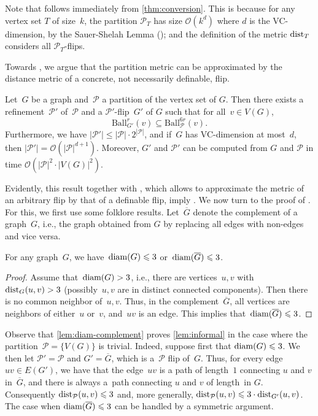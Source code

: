 \documentclass[a4paper,UKenglish,cleveref, autoref, thm-restate]{lipics-v2021}
\newcommand{\Oof}{{\cal O}}
\renewcommand{\cal}{\mathcal}
\newcommand{\dist}{\textnormal{dist}}
\newcommand{\diam}{\textnormal{diam}}
\newcommand{\PP}{\mathcal{P}}
\renewcommand{\le}{\leqslant}
\renewcommand{\leq}{\le}
\newcommand{\Ball}{\mathrm{Ball}}
\newcommand{\Oh}{\mathcal{O}}
\begin{document}
Note that  follows immediately from \cref{thm:conversion}. This is because for any vertex set $T$ of size~$k$, the partition $\PP_T$ has size $\Oh(k^d)$ where $d$ is the VC-dimension, by the Sauer-Shelah Lemma (); and the definition of the metric $\dist_T$ considers all $\PP_T$-flips.










Towards , we argue that the partition metric can be approximated by the distance metric of a concrete, not necessarily definable, flip. 

\begin{lemma}
  Let~$G$ be a graph and~$\PP$ a partition of the vertex set of $G$.
  Then there exists a refinement~$\PP'$ of~$\PP$ and a $\PP'$-flip~$G'$ of $G$ such that for all~$v \in V(G)$,
  \[ \Ball^r_{G'}(v) \subseteq \Ball^{6r}_\PP(v). \]
  Furthermore, we have  $|\PP'| \le |\PP| \cdot2^{|\PP|}$, and if~$G$ has VC-dimension at most~$d$, then $|\PP'| = \Oof(|\PP|^{d+1})$.
  Moreover, $G'$ and $\PP'$ can be computed from $G$ and $\PP$ in time $\cal{O}(|\PP|^2\cdot |V(G)|^2)$.
  \label{lem:informal}
\end{lemma}

Evidently, this result together with , which allows to approximate the metric of an arbitrary flip by that of a definable flip, imply . We now turn to the proof of . For this, we first use some folklore results.
Let~$\overline{G}$ denote the complement of a graph~$G$, i.e., the graph obtained from $G$ by replacing all edges with non-edges and vice versa.
\begin{lemma}
  \label{lem:diam-complement}
  For any graph~$G$, we have~$\diam(G) \le \diamBound$ or~$\diam(\overline{G}) \le \diamBound$.
\end{lemma}
\begin{proof}
  Assume that~$\diam(G) > 3$, i.e., there are vertices~$u,v$ with~$\dist_G(u,v) > 3$ (possibly~$u,v$ are in distinct connected components).
  Then there is no common neighbor of~$u,v$.
  Thus, in the complement~$\overline{G}$, all vertices are neighbors of either~$u$ or~$v$, and~$uv$ is an edge.
  This implies that~$\diam(\overline{G}) \le 3$.
\end{proof}
Observe that \cref{lem:diam-complement} proves \cref{lem:informal} in the case where the partition~$\PP = \{V(G)\}$ is trivial. Indeed, suppose first that $\diam(G)\leq \diamBound$. We then let $\PP'=\PP$ and $G'=\overline{G}$, which is a~$\PP$ flip of~$G$. Thus, for every edge~$uv \in E(G')$, we have that
the edge~$uv$ is a path of length~$1$ connecting $u$ and $v$ in~$\overline{G}$, and there is always a~path connecting $u$ and $v$ of length~\diamBound in $G$. Consequently $\dist_{\PP}(u,v)\leq \diamBound$ and, more generally, $\dist_{\PP}(u,v) \leq \diamBound \cdot \dist_{G'}(u,v)$. The case when $\diam(\overline{G})\leq \diamBound$ can be handled by a symmetric argument.
\end{document}
